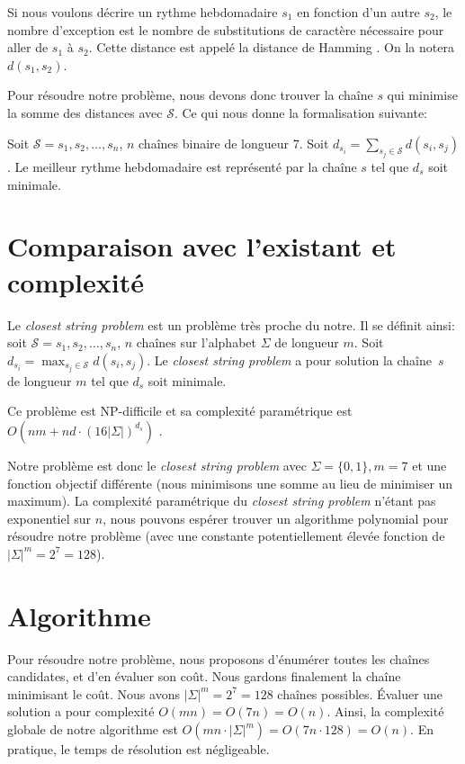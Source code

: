 \documentclass{roadef}
\def\S{\mathcal{S}}
\begin{document}
Si nous voulons décrire un rythme hebdomadaire $s_1$ en fonction d'un
autre $s_2$, le nombre d'exception est le nombre de substitutions de
caractère nécessaire pour aller de $s_1$ à $s_2$. Cette distance est
appelé la distance de Hamming \cite{hamming1950error}. On la notera
$d(s_1, s_2)$.

Pour résoudre notre problème, nous devons donc trouver la chaîne $s$
qui minimise la somme des distances avec $\S$. Ce qui nous donne la
formalisation suivante:

Soit $\S = s_1, s_2, \ldots, s_n$, $n$ chaînes binaire de
longueur 7. Soit
\begin{math}
  d_{s_i} = \sum_{s_j\in\S} d(s_i, s_j)
\end{math}.
Le meilleur rythme hebdomadaire est représenté par la chaîne $s$ tel
que $d_s$ soit minimale.

\section{Comparaison avec l'existant et complexité}

Le \emph{closest string problem} est un problème très proche du notre.
Il se définit ainsi: soit $\S = s_1, s_2, \ldots, s_n$, $n$ chaînes
sur l'alphabet $\Sigma$ de longueur $m$.  Soit $d_{s_i} = \max_{s_j\in\S}
d(s_i, s_j)$. Le \emph{closest string problem} a pour solution la
chaîne~$s$ de longueur $m$ tel que $d_s$ soit minimale.

Ce problème est NP-difficile \cite{lanctot2003distinguishing} et sa
complexité paramétrique est
\begin{math}
  O(nm + nd\cdot(16|\Sigma|)^{d_s})
\end{math}
\cite{ma2008more}.

Notre problème est donc le \emph{closest string problem} avec $\Sigma
= \{0, 1\}, m = 7$ et une fonction objectif différente (nous
minimisons une somme au lieu de minimiser un maximum). La complexité
paramétrique du \emph{closest string problem} n'étant pas exponentiel
sur $n$, nous pouvons espérer trouver un algorithme polynomial pour
résoudre notre problème (avec une constante potentiellement élevée
fonction de $|\Sigma|^m = 2^7 = 128$).

\section{Algorithme}

Pour résoudre notre problème, nous proposons d'énumérer toutes les
chaînes candidates, et d'en évaluer son coût. Nous gardons finalement
la chaîne minimisant le coût. Nous avons $|\Sigma|^m = 2^7 = 128$
chaînes possibles. Évaluer une solution a pour complexité $O(mn) =
O(7n) = O(n)$. Ainsi, la complexité globale de notre algorithme est
$O(mn\cdot|\Sigma|^m) = O(7n\cdot128) = O(n)$. En pratique, le temps
de résolution est négligeable.
\end{document}
